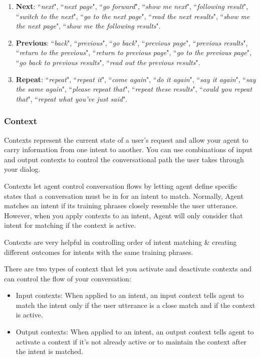 \documentclass{scrreprt}
\begin{document}
\begin{enumerate}
\begin{enumerate}
        \item \textbf{Next}: ``\textit{next}", ``\textit{next page}", ``\textit{go forward}", ``\textit{show me next}", ``\textit{following result}", ``\textit{switch to the next}", ``\textit{go to the next page}", ``\textit{read the next results}", ``\textit{show me the next page}", ``\textit{show me the following results}".
        \item \textbf{Previous}: ``\textit{back}", ``\textit{previous}", ``\textit{go back}", ``\textit{previous page}", ``\textit{previous results}", ``\textit{return to the previous}", ``\textit{return to previous page}", ``\textit{go to the previous page}", ``\textit{go back to previous results}", ``\textit{read out the previous results}".
        \item \textbf{Repeat}: ``\textit{repeat}", ``\textit{repeat it}", ``\textit{come again}", ``\textit{do it again}", ``\textit{say it again}", ``\textit{say the same again}", ``\textit{please repeat that}", ``\textit{repeat these results}", ``\textit{could you repeat that}", ``\textit{repeat what you've just said}".
    \end{enumerate}
    
\end{enumerate}


\subsubsection{Context}

Contexts represent the current state of a user's request and allow your agent to carry information from one intent to another. You can use combinations of input and output contexts to control the conversational path the user takes through your dialog.

Contexts let agent control conversation flows by letting agent define specific states that a conversation must be in for an intent to match. Normally, Agent matches an intent if its training phrases closely resemble the user utterance. However, when you apply contexts to an intent, Agent will only consider that intent for matching if the context is active.

Contexts are very helpful in controlling order of intent matching \& creating different outcomes for intents with the same training phrases.

There are two types of context that let you activate and deactivate contexts and can control the flow of your conversation:

\begin{itemize}

\item Input contexts: When applied to an intent, an input context tells agent to match the intent only if the user utterance is a close match and if the context is active.
\item  Output contexts: When applied to an intent, an output context tells agent to activate a context if it's not already active or to maintain the context after the intent is matched.
\end{itemize}
\end{document}
